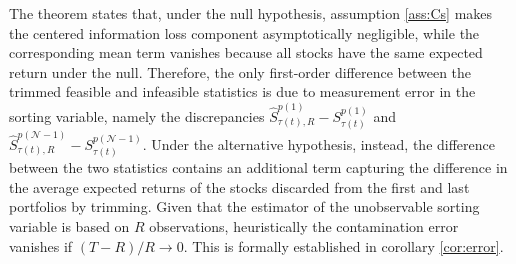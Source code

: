 \noindent
The theorem states that, under the null hypothesis, assumption \ref{ass:Cs} makes the centered information loss component asymptotically negligible, while the corresponding mean term vanishes because all stocks have the same expected return under the null. Therefore, the only first-order difference between the trimmed feasible and infeasible statistics is due to measurement error in the sorting variable, namely the discrepancies $\widehat{S}_{\tau(t),R}^{p(1)}-S_{\tau(t)}^{p(1)}$ and $\widehat{S}_{\tau(t),R}^{p(\mathcal{N}-1)}-S_{\tau(t)}^{p(\mathcal{N}-1)}$. Under the alternative hypothesis, instead, the difference between the two statistics contains an additional term capturing the difference in the average expected returns of the stocks discarded from the first and last portfolios by trimming. Given that the estimator of the unobservable sorting variable is based on $R$ observations, heuristically the contamination error vanishes if $(T-R)/R \rightarrow 0$. This is formally established in corollary \ref{cor:error}.

